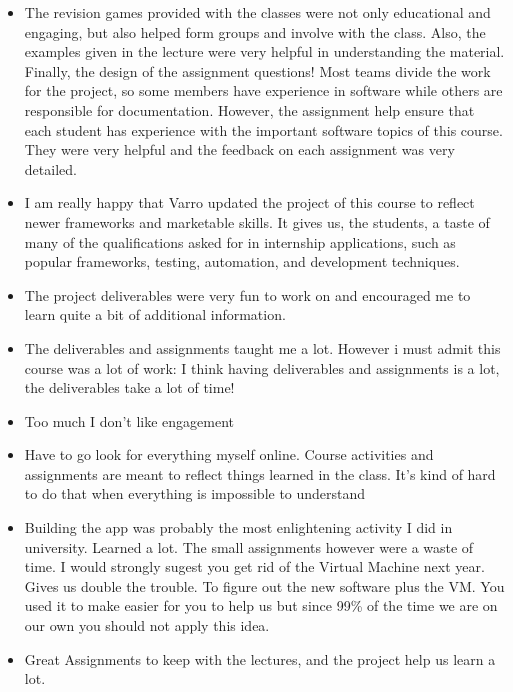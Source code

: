 \begin{itemize}
\item The revision games provided with the classes were not only educational and engaging, but also helped form groups and involve with the class. Also, the examples given in the lecture were very helpful in understanding the material. Finally, the design of the assignment questions! Most teams divide the work for the project, so some members have experience in software while others are responsible for documentation. However, the assignment help ensure that each student has experience with the important software topics of this course. They were very helpful and the feedback on each assignment was very detailed. 

\item I am really happy that Varro updated the project of this course to reflect newer frameworks and marketable skills. It gives us, the students, a taste of many of the qualifications asked for in internship applications, such as popular frameworks, testing, automation, and development techniques. 


\item The project deliverables were very fun to work on and encouraged me to learn quite a bit of additional information. 

\item The deliverables and assignments taught me a lot. However i must admit this course was a lot of work: I think having deliverables and assignments is a lot, the deliverables take a lot of time! 

\item Too much I don't like engagement 

\item Have to go look for everything myself online. Course activities and assignments are meant to reflect things learned in the class. It's kind of hard to do that when everything is impossible to understand 

\item Building the app was probably the most enlightening activity I did in university. Learned a lot. The small assignments however were a waste of time. I would strongly sugest you get rid of the Virtual Machine next year. Gives us double the trouble. To figure out the new software plus the VM. You used it to make easier for you to help us but since 99\% of the time we are on our own you should not apply this idea.

\item Great Assignments to keep with the lectures, and the project help us learn a lot. 


\end{itemize}
